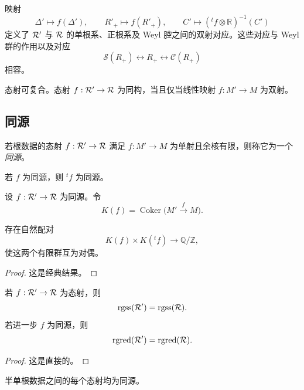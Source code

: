 \begin{proposition}\label{sga3:XXI:6.1.3}
映射
\[
 \Delta'\longmapsto f(\Delta'),\qquad
 R'_+\longmapsto f(R'_+),\qquad
 C'\longmapsto({}^tf\otimes\mathbb R)^{-1}(C')
\]
定义了 \(\mathcal{R}'\) 与 \(\mathcal{R}\) 的单根系、正根系及 Weyl 腔之间的双射对应。这些对应与 Weyl 群的作用以及对应
\[
 \mathscr{S}(R_+)\longleftrightarrow R_+
 \longleftrightarrow\mathscr{C}(R_+)
\]
相容。
\end{proposition}

\begin{lemma}\label{sga3:XXI:6.1.4}
态射可复合。态射 \(f:\mathcal{R}'\to\mathcal{R}\) 为同构，当且仅当线性映射 \(f:M'\to M\) 为双射。
\end{lemma}

\subsection{同源}\label{sga3:XXI:6.2}

\begin{definition}\label{sga3:XXI:6.2.1}
若根数据的态射 \(f:\mathcal{R}'\to\mathcal{R}\) 满足 \(f:M'\to M\) 为单射且余核有限，则称它为一个\emph{同源}。
\end{definition}

若 \(f\) 为同源，则 \({}^tf\) 为同源。

\begin{definition}\label{sga3:XXI:6.2.2}
设 \(f:\mathcal{R}'\to\mathcal{R}\) 为同源。令
\[
 K(f)=\operatorname{Coker}\bigl(M'\xrightarrow{f}M\bigr).
\]
\end{definition}

\begin{lemma}\label{sga3:XXI:6.2.3}
存在自然配对
\[
 K(f)\times K({}^tf)\longrightarrow\mathbb Q/\mathbb Z,
\]
使这两个有限群互为对偶。
\end{lemma}

\begin{proof}
这是经典结果。
\end{proof}

\begin{lemma}\label{sga3:XXI:6.2.4}
若 \(f:\mathcal{R}'\to\mathcal{R}\) 为态射，则
\[
 \operatorname{rgss}(\mathcal{R}')=\operatorname{rgss}(\mathcal{R}).
\]
若进一步 \(f\) 为同源，则
\[
 \operatorname{rgred}(\mathcal{R}')=\operatorname{rgred}(\mathcal{R}).
\]
\end{lemma}

\begin{proof}
这是直接的。
\end{proof}

\begin{lemma}\label{sga3:XXI:6.2.5}
半单根数据之间的每个态射均为同源。
\end{lemma}

